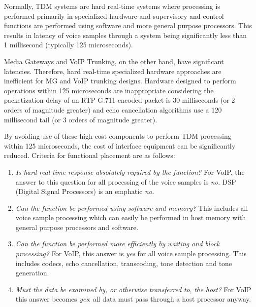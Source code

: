 \documentclass[letterpaper,final,notitlepage,twocolumn,10pt,twoside]{article}
\begin{document}
Normally, TDM systems are hard real-time systems where processing is performed
primarily in specialized hardware and supervisory and control functions are
performed using software and more general purpose processors.  This results in
latency of voice samples through a system being significantly less than 1
millisecond (typically 125 microseconds).

Media Gateways and VoIP Trunking, on the other hand, have significant latencies.
Therefore, hard real-time specialized hardware approaches are inefficient for
MG and VoIP trunking designs.  Hardware designed to perform operations within
125 microseconds are inappropriate considering the packetization delay of an RTP
G.711 encoded packet is 30 milliseconds (or 2 orders of magnitude greater) and
echo cancellation algorithms use a 120 millisecond tail (or 3 orders of
magnitude greater).

By avoiding use of these high-cost components to perform TDM processing within
125 microseconds, the cost of interface equipment can be significantly reduced.
Criteria for functional placement are as follows:

\begin{enumerate}
\item \textsl{Is hard real-time response absolutely required by the function?}
	For VoIP, the answer to this question for all processing of the voice
	samples is \textit{no}.  DSP (Digital Signal Processors) is an emphatic
	\textit{no}.
\item \textsl{Can the function be performed using software and memory?}
	This includes all voice sample processing which can easily be performed
	in host memory with general purpose processors and software.
\item \textsl{Can the function be performed more efficiently by waiting and block
processing?}
	For VoIP, this answer is \textit{yes} for all voice sample processing.
	This includes codecs, echo cancellation, transcoding, tone detection and
	tone generation.
\item \textsl{Must the data be examined by, or otherwise transferred to, the host?}
	For VoIP this answer becomes \textit{yes}: all data must pass through
	a host processor anyway.
\end{enumerate}
\end{document}
